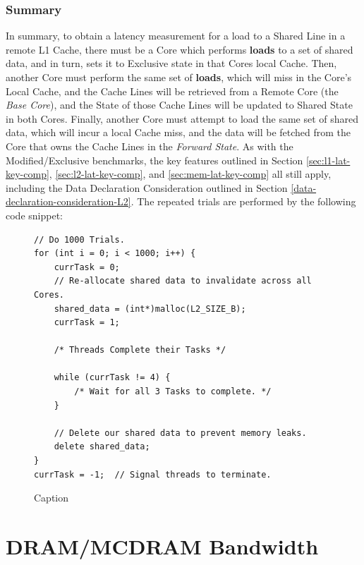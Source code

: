 \documentclass[bsc,frontabs,twoside,singlespacing,parskip,deptreport]{infthesis}     %
\begin{document}
\subsubsection{Summary}
In summary, to obtain a latency measurement for a load to a Shared Line in a remote L1 Cache, there must be a Core which performs \textbf{loads} to a set of shared data, and in turn, sets it to Exclusive state in that Cores local Cache. Then, another Core must perform the same set of \textbf{loads}, which will miss in the Core's Local Cache, and the Cache Lines will be retrieved from a Remote Core (the \emph{Base Core}), and the State of those Cache Lines will be updated to Shared State in both Cores. Finally, another Core must attempt to load the same set of shared data, which will incur a local Cache miss, and the data will be fetched from the Core that owns the Cache Lines in the \textit{Forward State}. As with the Modified/Exclusive benchmarks, the key features outlined in Section \ref{sec:l1-lat-key-comp}, \ref{sec:l2-lat-key-comp}, and \ref{sec:mem-lat-key-comp} all still apply, including the Data Declaration Consideration outlined in Section \ref{data-declaration-consideration-L2}. The repeated trials are performed by the following code snippet:
\begin{figure}[!h]
    \centering
    \begin{minipage}{0.8\textwidth}
    \begin{verbatim}
// Do 1000 Trials.
for (int i = 0; i < 1000; i++) {
    currTask = 0;
    // Re-allocate shared data to invalidate across all Cores.
    shared_data = (int*)malloc(L2_SIZE_B);
    currTask = 1;

    /* Threads Complete their Tasks */
        
    while (currTask != 4) {
        /* Wait for all 3 Tasks to complete. */
    }

    // Delete our shared data to prevent memory leaks.
    delete shared_data;
}
currTask = -1;  // Signal threads to terminate.
    \end{verbatim}
    \end{minipage}
    \caption{Caption}
    \label{fig:remote-S-repeat}
\end{figure}

\newpage


\section{DRAM/MCDRAM Bandwidth}\label{mcdram-dram-benchmarks-bw}
\end{document}
